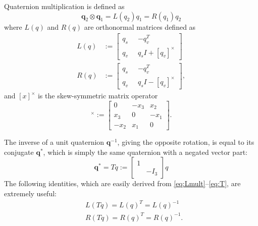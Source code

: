 \documentclass[letterpaper, 10 pt, conference]{ieeeconf}  %
\newcommand{\skewmat}[1]{[#1]^\times}
\newcommand{\q}{\textbf{q}}
\begin{document}
        Quaternion multiplication is defined as
        \begin{equation} \label{eq:quat_mult}
            \q_2 \otimes \q_1 = L(q_2) q_1 = R(q_1) q_2
        \end{equation}
        where $L(q)$ and $R(q)$ are orthonormal matrices defined as
        \begin{align}
            L(q) &:= \begin{bmatrix} 
                q_s \;\; & -q_v^T \\ 
                q_v \;\; & q_s I + \skewmat{q_v} 
            \end{bmatrix} 
            \label{eq:Lmult} \\
            R(q) &:=\begin{bmatrix} 
                q_s \;\; & -q_v^T \\ 
                q_v \;\; & q_s I - \skewmat{q_v} 
            \end{bmatrix} \label{eq:Rmult},
        \end{align}
        and $\skewmat{x}$ is the skew-symmetric matrix operator
        \begin{equation}
            \skewmat{x} := \begin{bmatrix} 
                0 & -x_3 & x_2 \\ 
                x_3 & 0 & -x_1\\ 
                -x_2 & x_1 & 0 
            \end{bmatrix}.
        \end{equation}
        
        The inverse of a unit quaternion $\q^{-1}$, giving the opposite rotation, is equal 
        to its conjugate $\q^*$, which is simply the same quaternion with a negated vector 
        part:
        \begin{equation} \label{eq:T}
            \q^* = T q := \begin{bmatrix} 
                1 & \\ 
                & -I_3 
            \end{bmatrix} q
        \end{equation}
        The following identities, which are easily derived from
        \eqref{eq:Lmult}--\eqref{eq:T}, are extremely useful:
        \begin{align}
            &L(Tq) = L(q)^T = L(q)^{-1} \\
            &R(Tq) = R(q)^T = R(q)^{-1} .
        \end{align}
        
\end{document}
